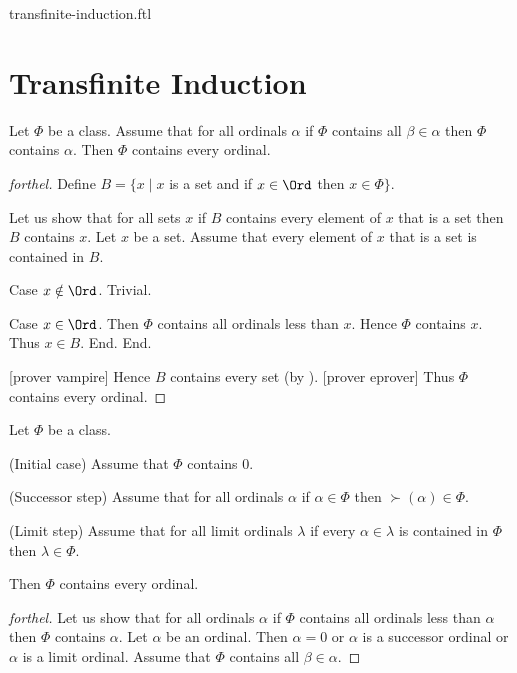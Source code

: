 \documentclass{naproche-library}
\begin{document}
\begin{smodule}{transfinite-induction.ftl}

  \section*{Transfinite Induction}

  \begin{theorem}[forthel,id=SET_THEORY_02_8493935460614144,printid]
    Let $\Phi$ be a class.
    Assume that for all ordinals $\alpha$ if $\Phi$ contains all $\beta \in \alpha$ then $\Phi$ contains $\alpha$.
    Then $\Phi$ contains every ordinal.
  \end{theorem}
  \begin{proof}[forthel]
    Define $B = \{ x \mid x$ is a set and if $x \in \Ord$ then $x \in \Phi \}$.

    Let us show that for all sets $x$ if $B$ contains every element of $x$ that is a set then $B$ contains $x$.
      Let $x$ be a set.
      Assume that every element of $x$ that is a set is contained in $B$.

      Case $x \notin \Ord$. Trivial.

      Case $x \in \Ord$.
        Then $\Phi$ contains all ordinals less than $x$.
        Hence $\Phi$ contains $x$.
        Thus $x \in B$.
      End.
    End.

    [prover vampire]
    Hence $B$ contains every set (by ).
    [prover eprover]
    Thus $\Phi$ contains every ordinal.
  \end{proof}

  \begin{theorem}[forthel,id=SET_THEORY_02_7892040431960064,printid]
    Let $\Phi$ be a class.
    
    (Initial case) Assume that $\Phi$ contains $0$.
    
    (Successor step) Assume that for all ordinals $\alpha$ if $\alpha \in \Phi$ then $\succ(\alpha) \in \Phi$.
    
    (Limit step) Assume that for all limit ordinals $\lambda$ if every $\alpha \in \lambda$ is contained in $\Phi$ then $\lambda \in \Phi$.
    
    Then $\Phi$ contains every ordinal.
  \end{theorem}
  \begin{proof}[forthel]
    Let us show that for all ordinals $\alpha$ if $\Phi$ contains all ordinals
    less than $\alpha$ then $\Phi$ contains $\alpha$.
      Let $\alpha$ be an ordinal.
      Then $\alpha = 0$ or $\alpha$ is a successor ordinal or $\alpha$ is a
      limit ordinal.
      Assume that $\Phi$ contains all $\beta \in \alpha$.


\end{proof}
\end{smodule}
\end{document}
